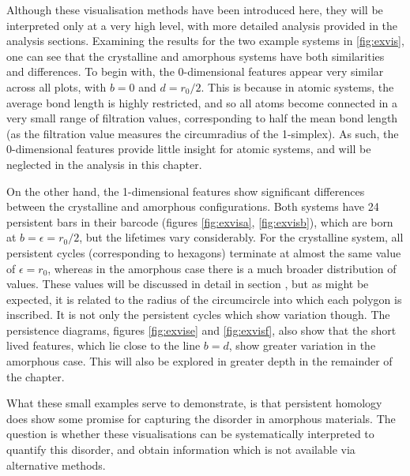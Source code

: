 Although these visualisation methods have been introduced here, they will be interpreted only at a very high level, with more detailed analysis provided in the analysis sections.
Examining the results for the two example systems in \ref{fig:exvis}, one can see that the crystalline and amorphous systems have both similarities and differences.
To begin with, the 0\--dimensional features appear very similar across all plots, with $b=0$ and $d=r_0/2$.
This is because in atomic systems, the average bond length is highly restricted, and so all atoms become connected in a very small range of filtration values, corresponding to half the mean bond length (as the filtration value measures the circumradius of the 1\--simplex).
As such, the $0$\--dimensional features provide little insight for atomic systems, and will be neglected in the analysis in this chapter.

On the other hand, the 1\--dimensional features show significant differences between the crystalline and amorphous configurations.
Both systems have 24 persistent bars in their barcode (figures \ref{fig:exvisa}, \ref{fig:exvisb}), which are born at $b=\epsilon=r_0/2$, but the lifetimes vary considerably. 
For the crystalline system, all persistent cycles (corresponding to hexagons) terminate at almost the same value of $\epsilon=r_0$, whereas in the amorphous case there is a much broader distribution of values.
These values will be discussed in detail in section , but as might be expected, it is related to the radius of the circumcircle into which each polygon is inscribed. 
It is not only the persistent cycles which show variation though.
The persistence diagrams, figures \ref{fig:exvise} and \ref{fig:exvisf}, also show that the short lived features, which lie close to the line $b=d$, show greater variation in the amorphous case.
This will also be explored in greater depth in the remainder of the chapter.

What these small examples serve to demonstrate, is that persistent homology does show some promise for capturing the disorder in amorphous materials.
The question is whether these visualisations can be systematically interpreted to quantify this disorder, and obtain information which is not available via alternative methods.

